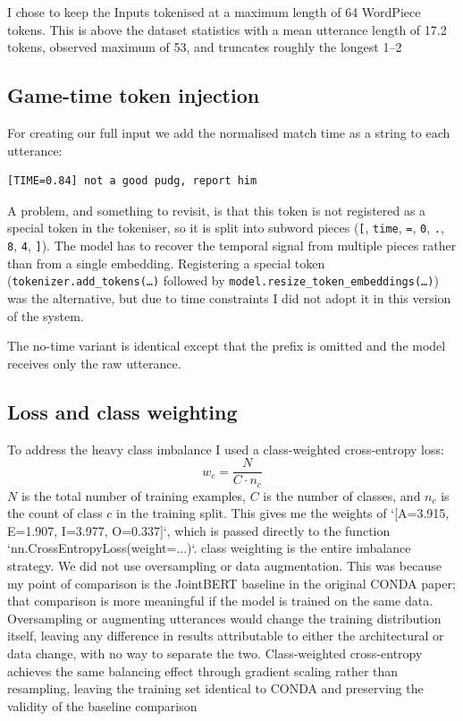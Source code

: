 \documentclass[a4paper,10.5pt,twoside]{article}
\begin{document}
I chose to keep the Inputs tokenised at a maximum length of 64 WordPiece tokens. This is above the dataset statistics with a mean utterance length of 17.2 tokens, observed maximum of 53, and truncates roughly the longest 1–2%

\subsection{Game-time token injection}
For creating our full input we add the normalised match time as a string to each utterance:

\begin{verbatim}
[TIME=0.84] not a good pudg, report him
\end{verbatim}

A problem, and something to revisit, is that this token is not registered as a special token in the tokeniser, so it is split into subword pieces (\texttt{[}, \texttt{time}, \texttt{=}, \texttt{0}, \texttt{.}, \texttt{8}, \texttt{4}, \texttt{]}). The model has to recover the temporal signal from multiple pieces rather than from a single embedding. Registering a special token (\texttt{tokenizer.add\_tokens(\ldots)} followed by \texttt{model.resize\_token\_embeddings(\ldots)}) was the alternative, but due to time constraints I did not adopt it in this version of the system.
\vspace{1em}

The no-time variant is identical except that the prefix is omitted and the model receives only the raw utterance.


\subsection{Loss and class weighting}
To address the heavy class imbalance I used a class-weighted cross-entropy loss:
\[
    w_c = \frac{N}{C \cdot n_c}
\]
$N$ is the total number of training examples, $C$ is the number of classes, and $n_c$ is the count of class $c$ in the training split. This gives me the weights of `[A=3.915, E=1.907, I=3.977, O=0.337]`, which is passed directly to the function `nn.CrossEntropyLoss(weight=...)`.    class weighting is the entire imbalance strategy. We did not use oversampling or data augmentation. This was because my point of comparison is the JointBERT baseline in the original CONDA paper; that comparison is more meaningful if the model is trained on the same data. Oversampling or augmenting utterances would change the training distribution itself, leaving any difference in results attributable to either the architectural or data change, with no way to separate the two. Class-weighted cross-entropy achieves the same balancing effect through gradient scaling rather than resampling, leaving the training set identical to CONDA and preserving the validity of the baseline comparison 
\end{document}
